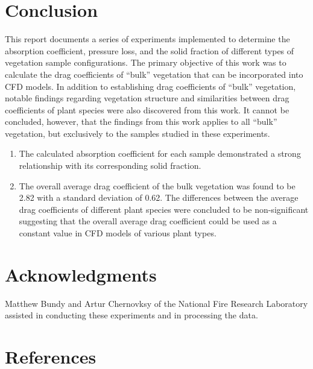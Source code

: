 \documentclass[12pt]{article}
\begin{document}
\section*{Conclusion}
This report documents a series of experiments implemented to determine the absorption coefficient, pressure loss, and the solid fraction of different types of vegetation sample configurations. The primary objective of this work was to calculate the drag coefficients of ``bulk'' vegetation that can be incorporated into CFD models. In addition to establishing drag coefficients of ``bulk''  vegetation, notable findings regarding vegetation structure and similarities between drag coefficients of plant species were also discovered from this work. It cannot be concluded, however, that the findings from this work applies to all ``bulk'' vegetation, but exclusively to the samples studied in these experiments.

\begin{enumerate}
  \item The calculated absorption coefficient for each sample demonstrated a strong relationship with its corresponding solid fraction.
  \item The overall average drag coefficient of the bulk vegetation was found to be 2.82 with a standard deviation of 0.62. The differences between the average drag coefficients of different plant species were concluded to be non-significant suggesting that the overall average drag coefficient could be used as a constant value in CFD models of various plant types.
\end{enumerate}

\section*{Acknowledgments}

\noindent Matthew Bundy and Artur Chernovksy of the National Fire Research Laboratory assisted in conducting these experiments and in processing the data.   \\
\pagebreak
\section*{References}


\end{document}
